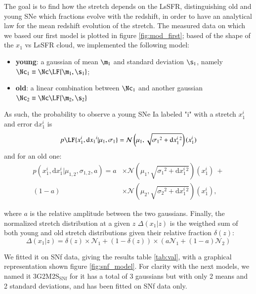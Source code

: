 \documentclass[]{aa} %
\begin{document}
The goal is to find how the stretch depends on the LsSFR, distinguishing old and
young SNe which fractions evolve with the redshift, in order to have an
analytical law for the mean redshift evolution of the stretch. The measured data
on which we based our first model is plotted in figure \ref{fig:mod_first};
based of the shape of the $x_1$ vs LsSFR cloud, we implemented the following
model:
\begin{itemize}
    \item \textbf{young}: a gaussian of mean $\m_1$ and standard deviation
        $\s_1$, namely $\Nc_1 \equiv \Nc \LF{\m_1,\s_1}$;
    \item \textbf{old}: a linear combination between $\Nc_1$ and another
        gaussian $\Nc_2 \equiv \Nc \LF{\m_2,\s_2}$
\end{itemize}
As such, the probability to observe a young SNe Ia labeled "i" with a stretch
$x_1^i$ and error $\mathrm{d} x_1^i$ is
\begin{equation}
    p \LF{x_1^i, \mathrm{d} x_1{}^i|\mu_1,\sigma_1} = \mathcal{N} \left(\mu_1,
    \sqrt{\sigma_1{}^2 + \mathrm{d} x_1^i{}^2}\right)(x_1^i)
\end{equation}
and for an old one:
\begin{align}
    p(x_1^i, \mathrm{d} x_1^i | \mu_{1,2}, \sigma_{1,2}, a) = a & \times
    \mathcal{N} \left(\mu_1, \sqrt{\sigma_1{}^2 + \mathrm{d} x_1^i{}^{2}}\right) (x_1^i) \ + \\ (1-a) & \times \mathcal{N}
    \left(\mu_2, \sqrt{ \sigma_2{}^2 + \mathrm{d} x_1^i{}^{2}}\right) (x_1^i), \nonumber 
\end{align}

\noindent where $a$ is the relative amplitude between the two gaussians.
Finally, the normalized stretch distribution at a given $z$
$\Delta\left(x_1|z\right)$ is
the weigthed sum of both young and old stretch distributions given their
relative fraction $\delta(z)$:
\begin{equation}
    \Delta\left(x_1|z\right) = \delta(z)\times\mathcal{N}_1 +
    \left(1-\delta(z)\right) \times \left(a\mathcal{N}_1 +
    (1-a)\mathcal{N}_2\right)
\end{equation}

We fitted it on SNf data, giving the results table \ref{tab:val}, with a graphical representation shown figure \ref{fig:snf_model}. For clarity
with the next models, we named it 3G2M2S$_{\text{SNf}}$ for it has a total of 3
gaussians but with only 2 means and 2 standard deviations, and has been fitted
on SNf data only. 
\end{document}
